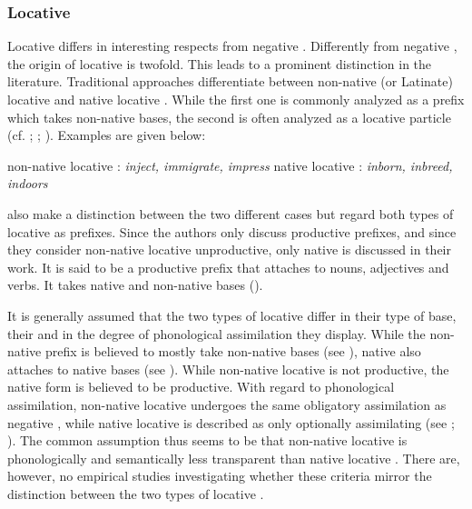\subsubsection{Locative } \label{locative in}

Locative  differs in interesting respects from negative . Differently from negative , the origin of locative  is twofold. This leads to a prominent distinction in the literature. Traditional approaches differentiate between non-native (or Latinate) locative  and native locative .  While the first one is commonly analyzed as a prefix which takes non-native bases, the second is often analyzed as a locative particle (cf. \citealt[497 ff]{Jespersen.1965}; \citealt[115,163 f]{Marchand.1969}; \citealt[1685]{Bauer.2002}). Examples are given below:

\begin{exe}
	\ex non-native locative : \hspace{0.7cm} \textit{inject, immigrate, impress}
	\ex native locative : \hspace{1.4cm} \textit{inborn, inbreed, indoors}
\end{exe}

\cite{Bauer.2013} also make a distinction between the two different cases but regard both types of locative  as prefixes. Since the authors only discuss productive prefixes, and since they consider non-native locative  unproductive,  only native  is discussed in their work. It is said to be a productive prefix that attaches to nouns, adjectives and verbs. It takes native and non-native bases (\citealt[334, 340]{Bauer.2013}).
 
 It is generally assumed that the two types of locative  differ in their type of base, their  and in the degree of phonological assimilation they display. While the non-native prefix is believed to mostly take non-native bases (see \citealt[499]{Jespersen.1965}), native  also attaches to native bases (see \citealt[334]{Bauer.2013}). While non-native locative  is not productive, the native form is believed to be productive. With regard to phonological assimilation, non-native locative  undergoes the same obligatory assimilation as negative , while native locative  is described as only optionally assimilating (see \citealt[499]{Jespersen.1965}; \citealt[335]{Bauer.2013}). The common assumption thus seems to be that non-native locative  is phonologically and semantically less transparent than native locative . There are, however, no empirical studies investigating whether these criteria mirror the distinction between the two types of locative . 
 


